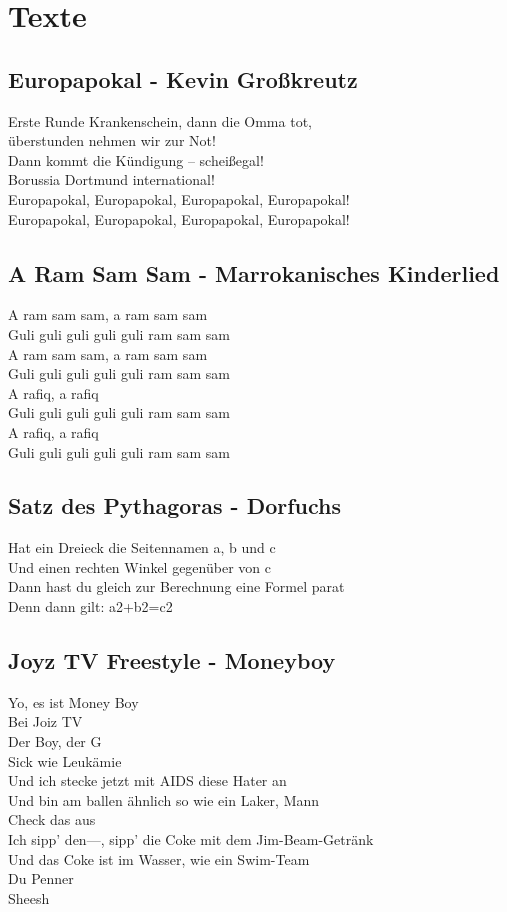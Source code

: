 \section{Texte}
\newpage
\subsection{Europapokal - Kevin Großkreutz}
Erste Runde Krankenschein, dann die Omma tot, \\
überstunden nehmen wir zur Not! \\
Dann kommt die Kündigung – scheißegal! \\
Borussia Dortmund international! \\
Europapokal, Europapokal, Europapokal, Europapokal! \\
Europapokal, Europapokal, Europapokal, Europapokal! \\
\newpage

\subsection{A Ram Sam Sam - Marrokanisches Kinderlied}
A ram sam sam, a ram sam sam \\
Guli guli guli guli guli ram sam sam \\
A ram sam sam, a ram sam sam \\
Guli guli guli guli guli ram sam sam \\
A rafiq, a rafiq \\
Guli guli guli guli guli ram sam sam \\
A rafiq, a rafiq \\
Guli guli guli guli guli ram sam sam \\
\newpage

\subsection{Satz des Pythagoras - Dorfuchs}
Hat ein Dreieck die Seitennamen a, b und c \\
Und einen rechten Winkel gegenüber von c \\
Dann hast du gleich zur Berechnung eine Formel parat \\
Denn dann gilt: a2+b2=c2 \\
\newpage

\subsection{Joyz TV Freestyle - Moneyboy}
Yo, es ist Money Boy\\
Bei Joiz TV\\
Der Boy, der G\\
Sick wie Leukämie\\
Und ich stecke jetzt mit AIDS diese Hater an\\
Und bin am ballen ähnlich so wie ein Laker, Mann\\
Check das aus\\
Ich sipp' den—, sipp' die Coke mit dem Jim-Beam-Getränk\\
Und das Coke ist im Wasser, wie ein Swim-Team\\
Du Penner\\
Sheesh\\
\newpage

